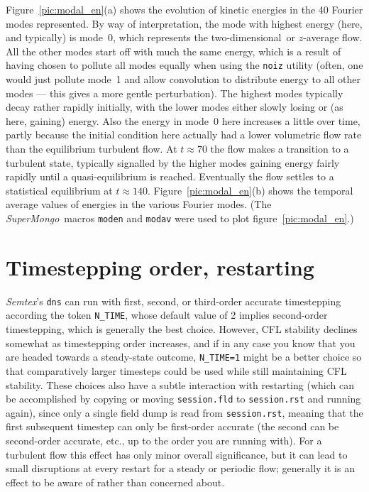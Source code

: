 \documentclass[11pt]{report}
\newcommand{\Semtex}{\emph{Semtex}} \newcommand{\Dog}{\emph{Dog}}
\newcommand{\SM}{\emph{SuperMongo}}
\newcommand\twod{two-di\-men\-sion\-al}
\begin{document}
Figure~\ref{pic:modal_en}(a) shows the evolution of kinetic energies
in the 40 Fourier modes represented.  By way of interpretation, the
mode with highest energy (here, and typically) is mode~0, which
represents the \twod\ or $z$-average flow.  All the other modes start
off with much the same energy, which is a result of having chosen to
pollute all modes equally when using the \verb|noiz| utility (often,
one would just pollute mode~1 and allow convolution to distribute
energy to all other modes --- this gives a more gentle perturbation).
The highest modes typically decay rather rapidly initially, with the
lower modes either slowly losing or (as here, gaining) energy.  Also
the energy in mode~0 here increases a little over time, partly because
the initial condition here actually had a lower volumetric flow rate
than the equilibrium turbulent flow. At $t\approx70$ the flow makes a
transition to a turbulent state, typically signalled by the higher
modes gaining energy fairly rapidly until a quasi-equilibrium is
reached. Eventually the flow settles to a statistical equilibrium at
$t\approx140$.  Figure~\ref{pic:modal_en}(b) shows the temporal
average values of energies in the various Fourier modes.  (The
\SM\ macros \verb|moden| and \verb|modav| were used to
plot figure~\ref{pic:modal_en}.)

\section{Timestepping order, restarting}
\label{sec.restart}

\Semtex's \verb|dns| can run with first, second, or third-order
accurate timestepping according the token \verb|N_TIME|, whose default
value of 2 implies second-order timestepping, which is generally the
best choice.  However, CFL stability declines somewhat as timestepping
order increases, and if in any case you know that you are headed
towards a steady-state outcome, \verb|N_TIME=1| might be a better
choice so that comparatively larger timesteps could be used while
still maintaining CFL stability.  These choices also have a subtle
interaction with restarting (which can be accomplished by copying or
moving \verb|session.fld| to \verb|session.rst| and running again),
since only a single field dump is read from \verb|session.rst|,
meaning that the first subsequent timestep can only be first-order
accurate (the second can be second-order accurate, etc., up to the
order you are running with).  For a turbulent flow this effect has
only minor overall significance, but it can lead to small disruptions
at every restart for a steady or periodic flow; generally it is an
effect to be aware of rather than concerned about.
\end{document}

